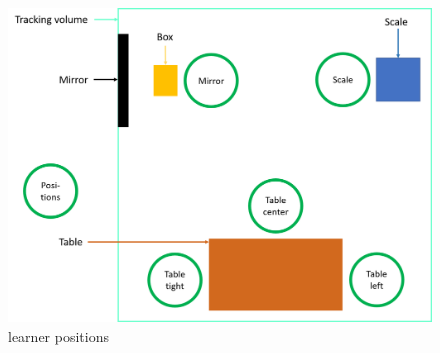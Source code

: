 \begin{figure}[htb]
	\centering
	\includegraphics[width=\textwidth]{figures/learner_positions.png}
	\caption[learner positions]{learner positions}
	\label{fig:learner_positions}
\end{figure}

